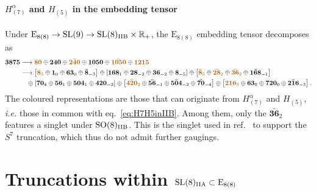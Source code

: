 \documentclass[11pt]{article}
\newcommand{\SO}{\ensuremath{\mathrm{SO}}\xspace}
\newcommand{\SL}{\ensuremath{\mathrm{SL}}\xspace}
\newcommand{\E}{\ensuremath{\mathrm{E}}\xspace}
\newcommand{\R}{\ensuremath{\mathbb{R}}\xspace}
\begin{document}
\paragraph{\boldmath $H_{(7)}^{\alpha}$ and $H_{(5)}$ in the embedding tensor} Under $\E_{8(8)}\rightarrow\SL(9)\rightarrow\SL(8)_{\rm IIB}\times\R_{+}$, the $\E_{8(8)}$ embedding tensor decomposes as
\begin{equation}
  \begin{aligned}
    \bm{3875} &\longrightarrow {\color{mydarkorange}\bm{80}} \oplus \bm{240} \oplus {\color{mydarkorange}\bm{\bar{240}}} \oplus \bm{1050} \oplus {\color{mydarkorange}\bm{\bar{1050}}} \oplus {\color{mydarkorange}\bm{1215}} \\
    &\longrightarrow \left[{\color{mydarkorange}\bm{8}_{3}} \oplus \bm{1}_{0} \oplus \bm{63}_{0} \oplus \bm{\bar{8}}_{-3}\right] \oplus \left[\bm{168}_{1} \oplus \bm{28}_{-2} \oplus \bm{36}_{-2} \oplus \bm{8}_{-5}\right] \oplus \left[{\color{mydarkorange}\bm{\bar{8}}_{5}} \oplus {\color{mydarkorange}\bm{\bar{28}}_{2}} \oplus {\color{mydarkorange}\bm{\bar{36}}_{2}} \oplus \bm{\bar{168}}_{-1} \right] \\
    &\quad \oplus \left[\bm{70}_{4} \oplus \bm{56}_{1} \oplus \bm{504}_{1} \oplus \bm{420}_{-2}\right] \oplus \left[{\color{mydarkorange}\bm{\bar{420}}_{2}} \oplus \bm{\bar{56}}_{-1} \oplus \bm{\bar{504}}_{-2}\oplus \bm{\bar{70}}_{-4} \right] \oplus \left[{\color{mydarkorange}\bm{216}_{3}} \oplus \bm{63}_{0} \oplus \bm{720}_{0} \oplus \bm{\bar{216}}_{-3}\right].
  \end{aligned}
\end{equation}
The coloured representations are those that can originate from $H_{(7)}^{\alpha}$ and $H_{(5)}$, \textit{i.e.} those in common with eq.~\eqref{eq:H7H5inIIB}. Among them, only the $\bm{\bar{36}}_{2}$ features a singlet under $\SO(8)_{\rm IIB}$. This is the singlet used in ref.~\cite{Galli:2022idq} to support the $S^{7}$ truncation, which thus do not admit further gaugings.


\section{Truncations within \texorpdfstring{$\SL(8)_{\rm IIA}\subset\E_{8(8)}$}{SL(8)IIA in E8(8)}}
\end{document}
